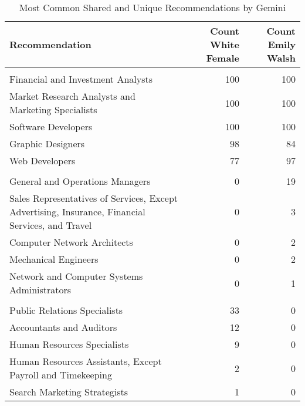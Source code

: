 \begin{table}

\caption{Most Common Shared and Unique Recommendations by Gemini}
\centering
\fontsize{7}{9}\selectfont
\begin{tabular}[t]{lrr}
\toprule
Recommendation & Count White Female & Count Emily Walsh\\
\midrule
\addlinespace[0.3em]
\multicolumn{3}{l}{\textbf{Shared}}\\
\hspace{1em}Financial and Investment Analysts & 100 & 100\\
\hspace{1em}Market Research Analysts and Marketing Specialists & 100 & 100\\
\hspace{1em}Software Developers & 100 & 100\\
\hspace{1em}Graphic Designers & 98 & 84\\
\hspace{1em}Web Developers & 77 & 97\\
\addlinespace[0.3em]
\multicolumn{3}{l}{\textbf{Emily Walsh}}\\
\hspace{1em}General and Operations Managers & 0 & 19\\
\hspace{1em}Sales Representatives of Services, Except Advertising, Insurance, Financial Services, and Travel & 0 & 3\\
\hspace{1em}Computer Network Architects & 0 & 2\\
\hspace{1em}Mechanical Engineers & 0 & 2\\
\hspace{1em}Network and Computer Systems Administrators & 0 & 1\\
\addlinespace[0.3em]
\multicolumn{3}{l}{\textbf{White Female}}\\
\hspace{1em}Public Relations Specialists & 33 & 0\\
\hspace{1em}Accountants and Auditors & 12 & 0\\
\hspace{1em}Human Resources Specialists & 9 & 0\\
\hspace{1em}Human Resources Assistants, Except Payroll and Timekeeping & 2 & 0\\
\hspace{1em}Search Marketing Strategists & 1 & 0\\
\bottomrule
\end{tabular}
\end{table}
